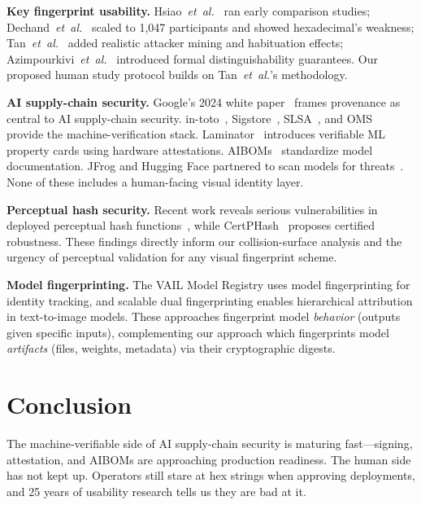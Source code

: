 \documentclass[conference,10pt]{IEEEtran}
\newcommand{\etal}{\textit{et~al.}}
\begin{document}
\noindent\textbf{Key fingerprint usability.}
Hsiao~\etal~\cite{hsiao2009study} ran early comparison studies; Dechand~\etal~\cite{dechand2016empirical} scaled to 1,047 participants and showed hexadecimal's weakness; Tan~\etal~\cite{tan2017unicorns} added realistic attacker mining and habituation effects; Azimpourkivi~\etal~\cite{azimpourkivi2020human} introduced formal distinguishability guarantees.
Our proposed human study protocol builds on Tan~\etal's methodology.

\noindent\textbf{AI supply-chain security.}
Google's 2024 white paper~\cite{google2024aisupplychain} frames provenance as central to AI supply-chain security.
in-toto~\cite{torres2019intoto}, Sigstore~\cite{sigstore2024docs,sigstore2025model}, SLSA~\cite{slsa2023spec}, and OMS~\cite{openssf2025oms} provide the machine-verification stack.
Laminator~\cite{laminator2024} introduces verifiable ML property cards using hardware attestations.
AIBOMs~\cite{aibom2026frontiers,owasp2025aibom} standardize model documentation.
JFrog and Hugging Face partnered to scan models for threats~\cite{jfrog2025hf}.
None of these includes a human-facing visual identity layer.

\noindent\textbf{Perceptual hash security.}
Recent work reveals serious vulnerabilities in deployed perceptual hash functions~\cite{berthier2024collision,zhang2025atkscopes}, while CertPHash~\cite{yang2025certphash} proposes certified robustness.
These findings directly inform our collision-surface analysis and the urgency of perceptual validation for any visual fingerprint scheme.

\noindent\textbf{Model fingerprinting.}
The VAIL Model Registry uses model fingerprinting for identity tracking, and scalable dual fingerprinting enables hierarchical attribution in text-to-image models.
These approaches fingerprint model \emph{behavior} (outputs given specific inputs), complementing our approach which fingerprints model \emph{artifacts} (files, weights, metadata) via their cryptographic digests.

\section{Conclusion}
\label{sec:conclusion}

The machine-verifiable side of AI supply-chain security is maturing fast---signing, attestation, and AIBOMs are approaching production readiness.
The human side has not kept up.
Operators still stare at hex strings when approving deployments, and 25 years of usability research tells us they are bad at it.
\end{document}
